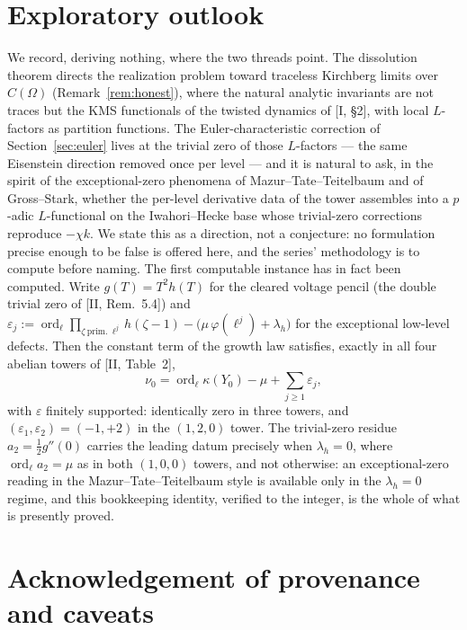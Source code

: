 \documentclass[11pt]{amsart}
\numberwithin{equation}{section}
\theoremstyle{definition}
\theoremstyle{remark}
\newcommand{\ord}{\operatorname{ord}}
\begin{document}
\section{Exploratory outlook}\label{sec:outlook}

We record, deriving nothing, where the two threads point. The dissolution theorem
directs the realization problem toward traceless Kirchberg limits over $C(\Omega)$
(Remark~\ref{rem:honest}), where the natural analytic invariants are not traces but
the KMS functionals of the twisted dynamics of [I, \S2], with local $L$-factors as
partition functions. The Euler-characteristic correction of
Section~\ref{sec:euler} lives at the trivial zero of those $L$-factors --- the same
Eisenstein direction removed once per level --- and it is natural to ask, in the
spirit of the exceptional-zero phenomena of Mazur--Tate--Teitelbaum and of
Gross--Stark, whether the per-level derivative data of the tower assembles into a
$p$-adic $L$-functional on the Iwahori--Hecke base whose trivial-zero corrections
reproduce $-\chi k$. We state this as a direction, not a conjecture: no formulation
precise enough to be false is offered here, and the series' methodology is to compute
before naming. The first computable instance has in fact been computed. Write
$g(T)=T^2h(T)$ for the cleared voltage pencil (the double trivial zero of [II,
Rem.~5.4]) and
$\varepsilon_j:=\ord_\ell\prod_{\zeta\ \mathrm{prim.}\ \ell^j}h(\zeta-1)
-\bigl(\mu\,\varphi(\ell^j)+\lambda_h\bigr)$
for the exceptional low-level defects. Then the constant term of the growth law
satisfies, exactly in all four abelian towers of [II, Table~2],
\[
\nu_0=\ord_\ell\kappa(Y_0)-\mu+\sum_{j\ge1}\varepsilon_j ,
\]
with $\varepsilon$ finitely supported: identically zero in three towers, and
$(\varepsilon_1,\varepsilon_2)=(-1,+2)$ in the $(1,2,0)$ tower. The trivial-zero
residue $a_2=\tfrac12g''(0)$ carries the leading datum precisely when $\lambda_h=0$,
where $\ord_\ell a_2=\mu$ as in both $(1,0,0)$ towers, and not otherwise: an
exceptional-zero reading in the Mazur--Tate--Teitelbaum style is available only in
the $\lambda_h=0$ regime, and this bookkeeping identity, verified to the integer, is
the whole of what is presently proved.

\section*{Acknowledgement of provenance and caveats}
\end{document}
